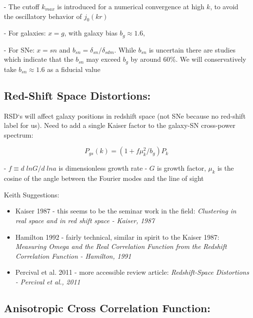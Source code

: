 \documentclass{article}
\begin{document}
- The cutoff $k_{max}$ is introduced for a numerical convergence at high $k$, to avoid the oscillatory behavior of $j_0(kr)$

- For galaxies: $x = g$, with galaxy bias $b_g \approx 1.6$,

- For SNe: $x = sn$ and $b_{sn} = \delta_{sn}/ \delta_{sdm}$. While $b_{sn}$ is uncertain there are studies which indicate that the $b_{sn}$ may exceed $b_{g}$ by around 60\%. We will conservatively take $b_{sn} \approx 1.6$ as a fiducial value

\subsection{Red-Shift Space Distortions:}

RSD`s will affect galaxy positions in redshift space (not SNe because no red-shift label for us). Need to add a single Kaiser factor to the galaxy-SN cross-power spectrum: 

\begin{equation}
P_{gs}(k) = (1 + f \mu^2_k / b_g) P_k
\end{equation}

- $f \equiv d \; ln G / d \; ln a$ is dimensionless growth rate
- $G$ is growth factor, $\mu_k$ is the cosine of the angle between the Fourier modes and the line of sight 

Keith Suggestions: 

\begin{itemize}
  \item Kaiser 1987 - this seems to be the seminar work in the field: \em{Clustering in real space and in red shift space - Kaiser, 1987}
  
  \item Hamilton 1992 - fairly technical, similar in spirit to the Kaiser 1987: \em{Measuring Omega and the Real Correlation Function from the Redshift Correlation Function - Hamilton, 1991}
  
  \item Percival et al. 2011 - more accessible review article: \em{Redshift-Space Distortions - Percival et al., 2011}
  
\end{itemize}

\subsection{Anisotropic Cross Correlation Function:}
\end{document}
